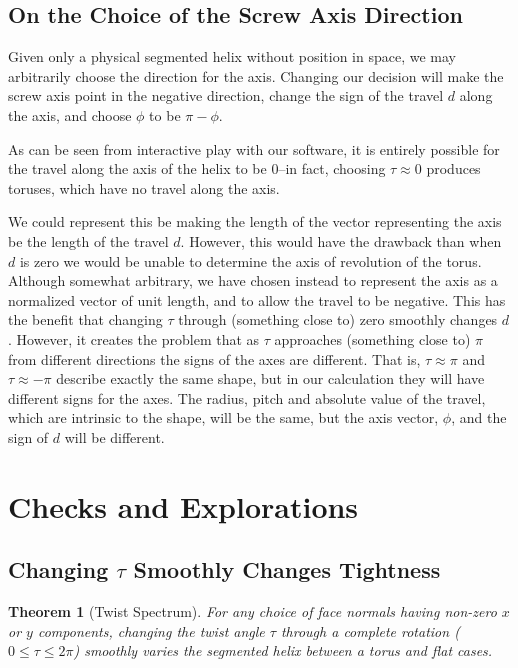 \documentclass[11pt]{article}
\newtheorem{theorem}{Theorem}
\begin{document}
{\subsection{On the Choice of the Screw Axis Direction}

Given only a physical segmented helix without position in space, we may arbitrarily choose the
direction for the axis. Changing our decision will make the screw axis point in the negative direction,
change the sign of the travel $d$ along the axis, and choose $\phi$ to be $\pi - \phi$.

As can be seen from interactive play with our software\cite{segmentedhelixinteractive}, it is entirely possible for the travel along
the axis of the helix to be $0$--in fact, choosing $\tau \approx 0$ produces toruses, which have no
travel along the axis.

We could represent this be making the length of the vector representing the axis be the length of the
travel $d$. However, this would have the drawback than when $d$ is zero we would be unable to determine
the axis of revolution of the torus. Although somewhat arbitrary, we have chosen instead to represent the
axis as a normalized vector of unit length, and to allow the travel to be negative. This has the benefit that
changing $\tau$ through (something close to) zero smoothly changes $d$. However, it creates the problem that as $\tau$ approaches
(something close to) $\pi$ from different directions the signs of the axes are different.
That is, $\tau \approx \pi$ and $\tau \approx -\pi$ describe exactly
the same shape, but in our calculation they will have different signs for the axes. The radius, pitch and
absolute value of the travel,
which are intrinsic to the shape, will be the same, but the axis vector, $\phi$, and the sign of $d$ will be different.

\section{Checks and Explorations}

\subsection{Changing $\tau$ Smoothly Changes Tightness}

\begin{theorem}[Twist Spectrum]
  For any choice of face normals having non-zero $x$ or $y$ components,
  changing the twist angle $\tau$ through a complete rotation ($0 \leq \tau \leq 2\pi$)
  smoothly varies the segmented helix
  between a torus and flat cases.
\end{theorem}


}
\end{document}
